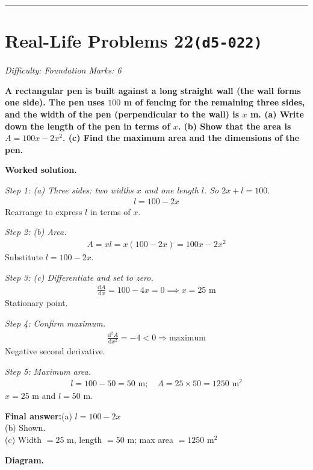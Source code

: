\documentclass[11pt]{article}
\newcommand{\question}[1]{\par\medskip\noindent\textbf{#1}\par}
\begin{document}
\medskip\hrule

\section*{Real-Life Problems 22\quad\small\texttt{(d5-022)}}
\textit{Difficulty: Foundation \quad\textbar\quad Marks: 6}

\question{A rectangular pen is built against a long straight wall (the wall forms one side). The pen uses \( 100 \) m of fencing for the remaining three sides, and the width of the pen (perpendicular to the wall) is \( x \) m. (a) Write down the length of the pen in terms of \( x \). (b) Show that the area is \( A = 100x - 2x^2 \). (c) Find the maximum area and the dimensions of the pen.}

\textbf{Worked solution.}

\textit{Step 1: (a) Three sides: two widths \( x \) and one length \( l \). So \( 2x + l = 100 \).}
\[\begin{gathered}
l = 100 - 2x
\end{gathered}\]
Rearrange to express \( l \) in terms of \( x \).

\textit{Step 2: (b) Area.}
\[\begin{gathered}
A = xl = x(100 - 2x) = 100x - 2x^2
\end{gathered}\]
Substitute \( l = 100 - 2x \).

\textit{Step 3: (c) Differentiate and set to zero.}
\[\begin{gathered}
\frac{\mathrm{d}A}{\mathrm{d}x} = 100 - 4x = 0 \implies x = 25 \text{ m}
\end{gathered}\]
Stationary point.

\textit{Step 4: Confirm maximum.}
\[\begin{gathered}
\frac{\mathrm{d}^2A}{\mathrm{d}x^2} = -4 < 0 \Rightarrow \text{maximum}
\end{gathered}\]
Negative second derivative.

\textit{Step 5: Maximum area.}
\[\begin{gathered}
l = 100 - 50 = 50 \text{ m}; \quad A = 25 \times 50 = 1250 \text{ m}^2
\end{gathered}\]
\( x = 25 \) m and \( l = 50 \) m.

\begin{answerbox}
\textbf{Final answer:}\quad (a) \(\displaystyle  l = 100 - 2x \) \\[3pt]  (b) Shown. \\[3pt]  (c) Width \(\displaystyle  = 25 \) m, length \(\displaystyle  = 50 \) m; max area \(\displaystyle  = 1250 \text{ m}^2 \)
\end{answerbox}
\textbf{Diagram.}
\end{document}
